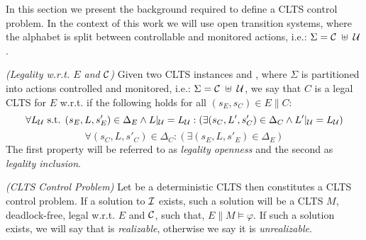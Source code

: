In this section we present the background required to define a CLTS control problem.  In the context of this work we will use open transition systems, where the alphabet is split between controllable and monitored actions, i.e.: $\Sigma=\mathcal{C} \; \uplus \;\mathcal{U}$.



\begin{definition}
	\label{def:legal_clts} \emph{(Legality w.r.t. $E$ and $\mathcal{C}$)} 
	Given two CLTS instances  and , where $\Sigma$ is partitioned into actions controlled and monitored, i.e.: $\Sigma=\mathcal{C} \; \uplus \;\mathcal{U}$, we say that $C$ is a legal CLTS for $E$ w.r.t. \controlSet if the following holds for all $(s_E,s_C) \in E \parallel C$:
	\[\forall L_{\mathcal{U}}\text{ s.t. }  (s_E, L, s'_E) \in \Delta_E \wedge L|_{\mathcal{U}} = L_{\mathcal{U}}:( \exists (s_C, L', s'_C) \in \Delta_C \wedge L'|_{\mathcal{U}} = L_{\mathcal{U}})\]
	\[\forall (s_C, L, s'_C) \in \Delta_C:( \exists (s_E, L, s'_E) \in \Delta_E)\]
	The first property will be referred to as \emph{legality openness} and the second as \emph{legality inclusion}.
\end{definition}

\begin{definition}
	\label{def:clts_control_problem} \emph{(CLTS Control Problem)} 
	Let  be a deterministic CLTS then \controlProblemDef constitutes a CLTS control problem. If a solution to $\mathcal{I}$ exists, such a solution will be a CLTS $M$, deadlock-free, legal w.r.t. $E$ and $\mathcal{C}$, such that, $E \parallel M \models \varphi$. If such a solution exists, we will say that \controlProblem is \emph{realizable}, otherwise we say it is \emph{unrealizable}.
\end{definition}
